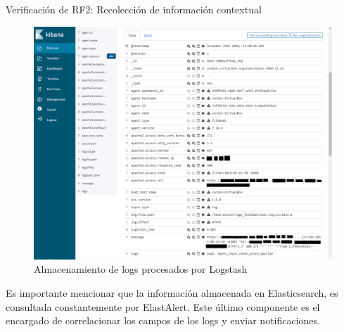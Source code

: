 \begin{section}{Verificación de RF2: Recolección de información contextual}
    \begin{figure}[H]
    \centering
    \includegraphics[width=1\textwidth]{./iteracion_2_imagenes/kibana_logs_parseados_2EDITADO.png}
    \caption{Almacenamiento de logs procesados por Logstash}
    \label{fig:iter2_logs_filtrados}
    \end{figure}
    \FloatBarrier
    Es importante mencionar que la información almacenada en Elasticsearch, es consultada constantemente por ElastAlert. Este último componente es el encargado de correlacionar los campos de los logs y enviar notificaciones.
    \end{section}
    \pagebreak
    
